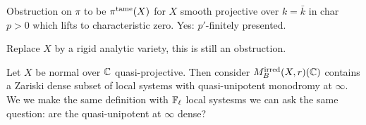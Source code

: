 \documentclass[12pt]{article}
\begin{document}
Obstruction on $\pi$ to be $\pi^{\mathrm{tame}}(X)$ for $X$ smooth projective over $k = \bar{k}$ in char $p > 0$ which lifts to characteristic zero. Yes: $p'$-finitely presented. 

\begin{conj}
Replace $X$ by a rigid analytic variety, this is still an obstruction.
\end{conj}

Let $X$ be normal over $\mathbb{C}$ quasi-projective. Then consider $M_B^{\text{irred}}(X, r)(\mathbb{C})$ contains a Zariski dense subset of local systems with quasi-unipotent monodromy at $\infty$. 
\bigskip\\
We we make the same definition with $\mathbb{F}_\ell$ local systesms we can ask the same question: are the quasi-unipotent at $\infty$ dense? 
\end{document}
